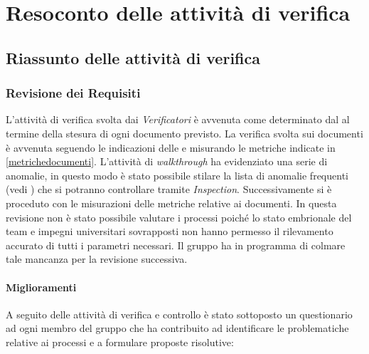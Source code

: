 \section{Resoconto delle attività di verifica}

	\subsection{Riassunto delle attività di verifica}
	\label{RiassuntoAttivitaVerifica}
	
	 	\subsubsection{Revisione dei Requisiti}
	 	L'attività di verifica svolta dai \emph{Verificatori} è avvenuta come determinato dal \PianoDiProgetto{} al termine della stesura di ogni documento previsto. La verifica svolta sui documenti è avvenuta seguendo le indicazioni delle \NormeDiProgetto{} e misurando le metriche indicate in \ref{metrichedocumenti}. L'attività di \emph{walkthrough} ha evidenziato una serie di anomalie, in questo modo è stato possibile stilare la lista di anomalie frequenti (vedi \NormeDiProgetto{}) che si potranno controllare tramite \emph{Inspection}. Successivamente si è proceduto con le misurazioni delle metriche relative ai documenti.
In questa revisione non è stato possibile valutare i processi poiché lo stato embrionale del team e   impegni universitari sovrapposti non hanno permesso il rilevamento accurato di tutti i parametri necessari. Il gruppo ha in programma di colmare tale mancanza per la revisione successiva.

		\paragraph{Miglioramenti}
		A seguito delle attività di verifica e controllo è stato sottoposto un questionario ad ogni membro del gruppo che ha contribuito ad identificare le problematiche relative ai processi e a formulare proposte risolutive:
		
